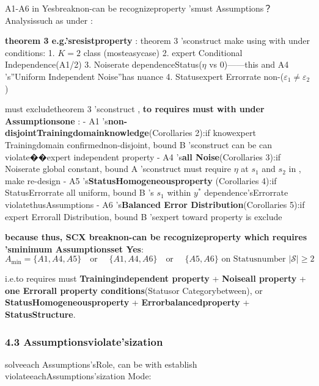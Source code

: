 \documentclass[
  12pt,
]{article}
\begin{document}
A1-A6 in Yesbreaknon-can be recognizeproperty 'smust Assumptions？Analysissuch as under : 

\textbf{theorem  3 e.g.'sresistproperty }: theorem  3 'sconstruct make using with under conditions: 1. \(K = 2\)
class (mosteasycase) 2. expert Conditional Independence(A1/2) 3. Noiserate dependenceStatus(\(\eta\)
vs 0)------this and  A4 's''Uniform Independent Noise''has nuance 4.
Statusexpert Errorrate non-(\(\varepsilon_1 \neq \varepsilon_2\))

must excludetheorem  3 'sconstruct , \textbf{to requires must with under Assumptionsone }:  - A1
's\textbf{non-disjointTrainingdomainknowledge}(Corollaries
2):if knowexpert Trainingdomain confirmednon-disjoint, bound  B 'sconstruct can be can violate��expert independent property  -
A4 's\textbf{all Noise}(Corollaries 3):if Noiserate global constant, bound  A 'sconstruct must require
\(\eta\) at  \(s_1\) and  \(s_2\) in , make re-design  - A5
's\textbf{StatusHomogeneousproperty }(Corollaries 4):if StatusErrorrate all uniform, bound  B 's \(s_1\)
within \(y^*\) dependence'sErrorrate violatethusAssumptions - A6 's\textbf{Balanced Error Distribution}(Corollaries
5):if expert Errorall Distribution, bound  B 'sexpert toward property is exclude

\textbf{because thus, SCX breaknon-can be recognizeproperty which requires 'sminimum Assumptionsset Yes}: 
\[A_{\min} = \{A1, A4, A5\} \quad \text{or } \quad \{A1, A4, A6\} \quad \text{or } \quad \{A5, A6\} \text{ on Statusnumber  } |\mathcal{S}| \geq 2\]

i.e.to requires must \textbf{Trainingindependent property } + \textbf{Noiseall property } +
\textbf{one Errorall property conditions}(Statusor Categorybetween), or \textbf{StatusHomogeneousproperty } +
\textbf{Errorbalancedproperty } + \textbf{StatusStructure}. 

\subsubsection{4.3
Assumptionsviolate'sization }\label{ux5047ux8bbeux8fddux53cdux65f6ux7684ux9000ux5316}

solveeach Assumptions'sRole, can be with establish violateeachAssumptions'sization Mode: 
\end{document}

